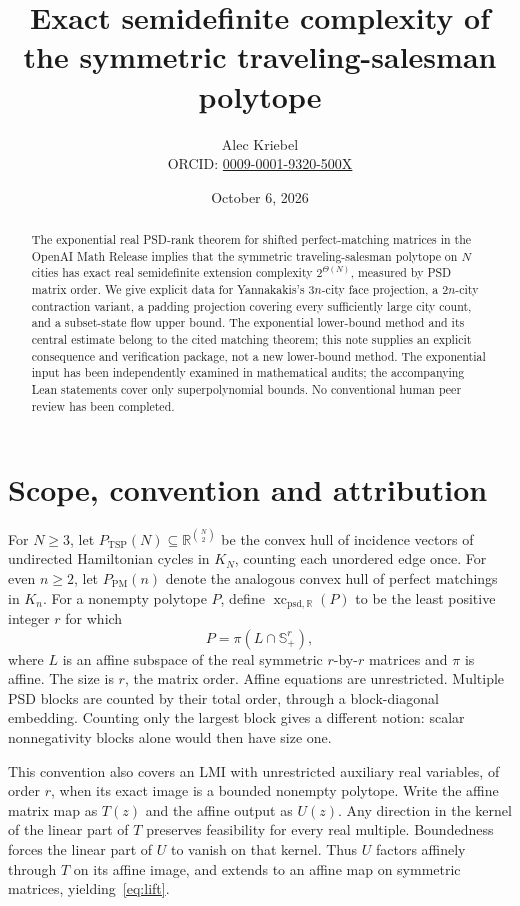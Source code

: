 \documentclass[11pt]{article}
\title{Exact semidefinite complexity of the symmetric traveling-salesman polytope}
\author{Alec Kriebel\\\small ORCID: \href{https://orcid.org/0009-0001-9320-500X}{0009-0001-9320-500X}}
\date{October 6, 2026}
\newcommand{\R}{\mathbb R}
\newcommand{\Splus}{\mathbb S_+}
\newcommand{\sxc}{\operatorname{xc}_{\mathrm{psd},\R}}
\newcommand{\PM}{P_{\mathrm{PM}}}
\newcommand{\TSP}{P_{\mathrm{TSP}}}
\begin{document}
\maketitle
\begin{abstract}
The exponential real PSD-rank theorem for shifted perfect-matching matrices in the OpenAI Math Release implies that the symmetric traveling-salesman polytope on $N$ cities has exact real semidefinite extension complexity $2^{\Theta(N)}$, measured by PSD matrix order. We give explicit data for Yannakakis's $3n$-city face projection, a $2n$-city contraction variant, a padding projection covering every sufficiently large city count, and a subset-state flow upper bound. The exponential lower-bound method and its central estimate belong to the cited matching theorem; this note supplies an explicit consequence and verification package, not a new lower-bound method. The exponential input has been independently examined in mathematical audits; the accompanying Lean statements cover only superpolynomial bounds. No conventional human peer review has been completed.
\end{abstract}

\section{Scope, convention and attribution}
For $N\ge3$, let $\TSP(N)\subseteq\R^{\binom N2}$ be the convex hull of incidence vectors of undirected Hamiltonian cycles in $K_N$, counting each unordered edge once. For even $n\ge2$, let $\PM(n)$ denote the analogous convex hull of perfect matchings in $K_n$.
For a nonempty polytope $P$, define $\sxc(P)$ to be the least positive integer $r$ for which
\begin{equation}\label{eq:lift}
 P=\pi(L\cap\Splus^r),
\end{equation}
where $L$ is an affine subspace of the real symmetric $r$-by-$r$ matrices and $\pi$ is affine. The size is $r$, the matrix order. Affine equations are unrestricted. Multiple PSD blocks are counted by their total order, through a block-diagonal embedding. Counting only the largest block gives a different notion: scalar nonnegativity blocks alone would then have size one.

This convention also covers an LMI with unrestricted auxiliary real variables, of order $r$, when its exact image is a bounded nonempty polytope. Write the affine matrix map as $T(z)$ and the affine output as $U(z)$. Any direction in the kernel of the linear part of $T$ preserves feasibility for every real multiple. Boundedness forces the linear part of $U$ to vanish on that kernel. Thus $U$ factors affinely through $T$ on its affine image, and extends to an affine map on symmetric matrices, yielding~\eqref{eq:lift}.
\end{document}
